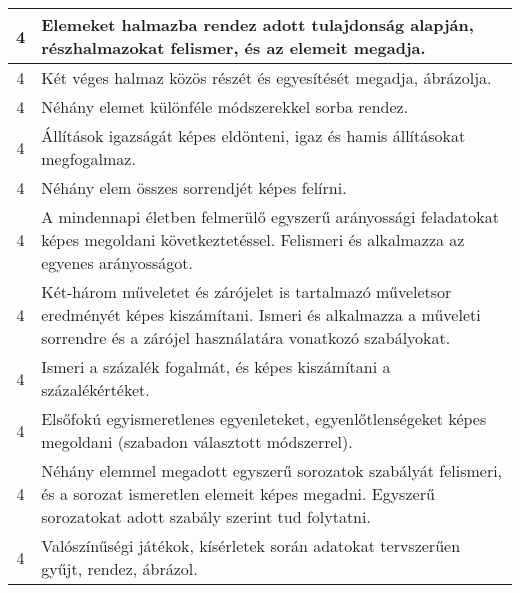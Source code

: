 \begin{longtable}{c | p{} }
                                
                                          4 &  Elemeket halmazba rendez adott tulajdonság alapján, részhalmazokat felismer, és az elemeit megadja. \\ \hline
                                          4 &  Két véges halmaz közös részét és egyesítését megadja, ábrázolja. \\ \hline
                                          4 &  Néhány elemet különféle módszerekkel sorba rendez. \\ \hline
                                          4 &  Állítások igazságát képes eldönteni, igaz és hamis állításokat megfogalmaz. \\ \hline
                                          4 &  Néhány elem összes sorrendjét képes felírni. \\ \hline
                                          4 &  A mindennapi életben felmerülő egyszerű arányossági feladatokat képes megoldani következtetéssel. Felismeri és alkalmazza az egyenes arányosságot. \\ \hline
                                          4 &  Két-három műveletet és zárójelet is tartalmazó műveletsor eredményét képes kiszámítani. Ismeri és alkalmazza a műveleti sorrendre és a zárójel használatára vonatkozó szabályokat. \\ \hline
                                          4 &  Ismeri a százalék fogalmát, és képes kiszámítani a százalékértéket. \\ \hline
                                          4 &  Elsőfokú egyismeretlenes egyenleteket, egyenlőtlenségeket képes megoldani (szabadon választott módszerrel). \\ \hline
                                          4 &  Néhány elemmel megadott egyszerű sorozatok szabályát felismeri, és a sorozat ismeretlen elemeit képes megadni. Egyszerű sorozatokat adott szabály szerint tud folytatni. \\ \hline
                                          4 &  Valószínűségi játékok, kísérletek során adatokat tervszerűen gyűjt, rendez, ábrázol. \\ \hline
                                      
                        \end{longtable}
            \clearpage

